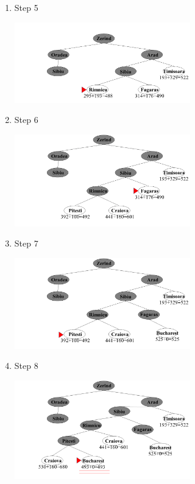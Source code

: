 \documentclass{article}
\begin{document}
\begin{enumerate}
\begin{enumerate}
  \item Step 5
  
  \includegraphics[width=0.6\textwidth]{figure/Slide5.PNG}

  \item Step 6
  
  \includegraphics[width=0.6\textwidth]{figure/Slide6.PNG}

  \item Step 7
  
  \includegraphics[width=0.6\textwidth]{figure/Slide7.PNG}

  \item Step 8
  
  \includegraphics[width=0.6\textwidth]{figure/Slide8.PNG}


\end{enumerate}



\end{enumerate}
\end{document}
